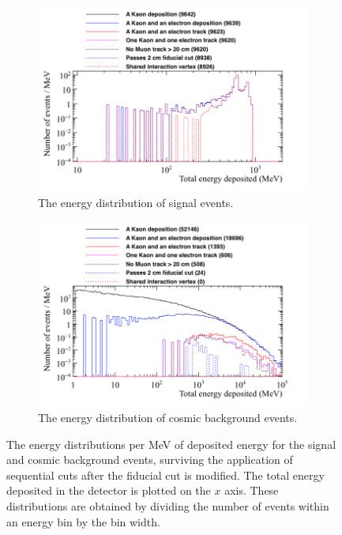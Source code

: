 \begin{figure}
  \centering
  \begin{subfigure}{0.8\textwidth}
    \includegraphics[width=\textwidth]{NucleonDecay_EnergyDepCuts_Norm}
    \caption{The energy distribution of signal events.}
    \label{fig:NDK_FidCut_EnLim_Sig}
  \end{subfigure}
  \begin{subfigure}{0.8\textwidth}
    \includegraphics[width=\textwidth]{CosmicBackground_EnergyDepCuts_Norm}
    \caption{The energy distribution of cosmic background events.}
    \label{fig:NDK_FidCut_EnLim_Cosmo}
  \end{subfigure}
  \caption[The energy distributions per MeV of deposited energy for the signal and cosmic background events, surviving the application of sequential cuts after the fiducial cut is modified]
          {The energy distributions per MeV of deposited energy for the signal and cosmic background events, surviving the application of sequential cuts after the fiducial cut is modified. The total energy deposited in the detector is plotted on the $x$ axis. These distributions are obtained by dividing the number of events within an energy bin by the bin width.}
  \label{fig:NDK_FidCut_EnLim}
\end{figure}

